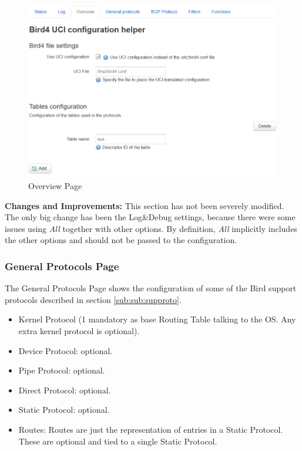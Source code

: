 \begin{figure}[H]
    \centering
    \includegraphics[width=\textwidth]{images/bird0.3/overview}
    \caption{Overview Page}
    \label{fig:overview}
\end{figure}

\textbf{Changes and Improvements:}
This section has not been severely modified. The only big change has been the Log\&Debug settings, because there were some issues using \textit{All} together with other options. By definition, \textit{All} implicitly includes the other options and should not be passed to the configuration.

\subsubsection{General Protocols Page}
The General Protocols Page shows the configuration of some of the Bird support protocols described in section \ref{sub:sub:supproto}.

\begin{itemize}
    \item Kernel Protocol (1 mandatory as base Routing Table talking to the OS. Any extra kernel protocol is optional).
    \item Device Protocol: optional.
    \item Pipe Protocol: optional.
    \item Direct Protocol: optional.
    \item Static Protocol: optional.
    \item Routes: Routes are just the representation of entries in a Static Protocol. These are optional and tied to a single Static Protocol.
\end{itemize}

